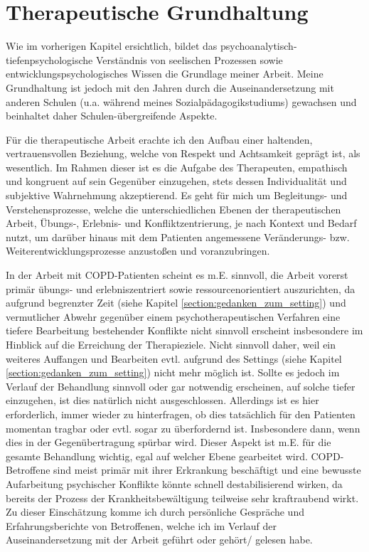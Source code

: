 \section{Therapeutische Grundhaltung} 
Wie im vorherigen Kapitel ersichtlich, bildet das psychoanalytisch-tiefenpsychologische Verständnis von seelischen Prozessen sowie entwicklungspsychologisches Wissen die Grundlage meiner Arbeit. Meine Grundhaltung ist jedoch mit den Jahren durch die Auseinandersetzung mit anderen Schulen (u.a. während meines Sozialpädagogikstudiums) gewachsen und beinhaltet daher Schulen-übergreifende Aspekte. 

Für die therapeutische Arbeit erachte ich den Aufbau einer haltenden, vertrauensvollen Beziehung, welche von Respekt und Achtsamkeit geprägt ist, als wesentlich. 
Im Rahmen dieser ist es die Aufgabe des Therapeuten, empathisch und kongruent auf sein Gegenüber einzugehen, stets dessen Individualität und subjektive Wahrnehmung akzeptierend. 
Es geht für mich um Begleitungs- und Verstehensprozesse, welche die unterschiedlichen Ebenen der therapeutischen Arbeit, Übungs-, Erlebnis- und Konfliktzentrierung, je nach Kontext und Bedarf nutzt, um darüber hinaus mit dem Patienten angemessene Veränderungs- bzw. Weiterentwicklungsprozesse anzustoßen und voranzubringen. 

In der Arbeit mit COPD-Patienten scheint es m.E. sinnvoll, die Arbeit vorerst primär übungs- und erlebniszentriert sowie ressourcenorientiert auszurichten, da aufgrund begrenzter Zeit (siehe Kapitel \ref{section:gedanken_zum_setting}) und vermutlicher Abwehr gegenüber einem psychotherapeutischen Verfahren eine tiefere Bearbeitung bestehender Konflikte nicht sinnvoll erscheint insbesondere im Hinblick auf die Erreichung der Therapieziele. Nicht sinnvoll daher, weil ein weiteres Auffangen und Bearbeiten evtl. aufgrund des Settings (siehe Kapitel \ref{section:gedanken_zum_setting}) nicht mehr möglich ist. Sollte es jedoch im Verlauf der Behandlung sinnvoll oder gar notwendig erscheinen, auf solche tiefer einzugehen, ist dies natürlich nicht ausgeschlossen. Allerdings ist es hier erforderlich, immer wieder zu hinterfragen, ob dies tatsächlich für den Patienten momentan tragbar oder evtl. sogar zu überfordernd ist. Insbesondere dann, wenn dies in der Gegenübertragung spürbar wird. Dieser Aspekt ist m.E. für die gesamte Behandlung wichtig, egal auf welcher Ebene gearbeitet wird. COPD-Betroffene sind meist primär mit ihrer Erkrankung beschäftigt und eine bewusste Aufarbeitung psychischer Konflikte könnte schnell destabilisierend wirken, da bereits der Prozess der Krankheitsbewältigung teilweise sehr kraftraubend wirkt. Zu dieser Einschätzung komme ich durch persönliche Gespräche und Erfahrungsberichte von Betroffenen, welche ich im Verlauf der Auseinandersetzung mit der Arbeit geführt oder gehört/ gelesen habe. 

